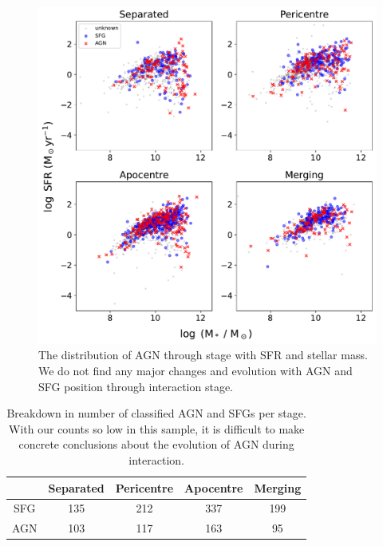 \begin{figure}
    \centering
    \includegraphics[width=\textwidth]{Chapter3/figures/agn-stage-dist.pdf}
    \caption[The distribution of AGN through stage with SFR and stellar mass.]{The distribution of AGN through stage with SFR and stellar mass. We do not find any major changes and evolution with AGN and SFG position through interaction stage. }
    \label{fig:agn-stage}
\end{figure}

\begin{table}
    \centering
    \begin{tabular}{|c|c|c|c|c|}
		\hline
         & Separated & Pericentre & Apocentre & Merging \\
         \hline
        SFG & 135 & 212 & 337 & 199 \\
        AGN & 103 & 117 & 163 & 95 \\
		\hline
    \end{tabular}
    \caption{Breakdown in number of classified AGN and SFGs per stage. With our counts so low in this sample, it is difficult to make concrete conclusions about the evolution of AGN during interaction.}
    \label{tab:agn-sfg-breakdown}
\end{table}

